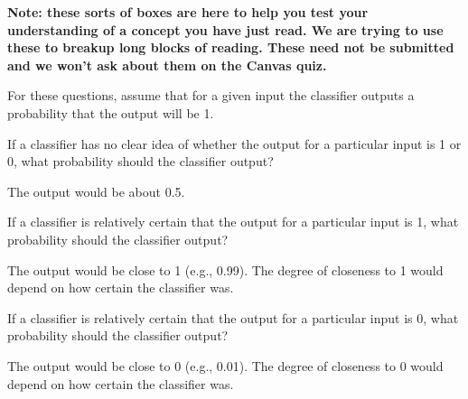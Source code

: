 \documentclass[assignment04_Solutions]{subfiles}
\begin{document}
\begin{understandingcheck}
\textbf{Note: these sorts of boxes are here to help you test your understanding of a concept you have just read.  We are trying to use these to breakup long blocks of reading.  These need not be submitted and we won't ask about them on the Canvas quiz.}

For these questions, assume that for a given input the classifier outputs a probability that the output will be 1.
\bes
\item If a classifier has no clear idea of whether the output for a particular input is 1 or 0, what probability should the classifier output?
\begin{boxedsolution}
The output would be about 0.5.
\end{boxedsolution}
\item If a classifier is relatively certain that the output for a particular input is 1, what probability should the classifier output?
\begin{boxedsolution}
The output would be close to 1 (e.g., 0.99).  The degree of closeness to 1 would depend on how certain the classifier was.
\end{boxedsolution}
\item If a classifier is relatively certain that the output for a particular input is 0, what probability should the classifier output?
\begin{boxedsolution}
The output would be close to 0 (e.g., 0.01).  The degree of closeness to 0 would depend on how certain the classifier was.
\end{boxedsolution}
\ees

\end{understandingcheck}
\end{document}
